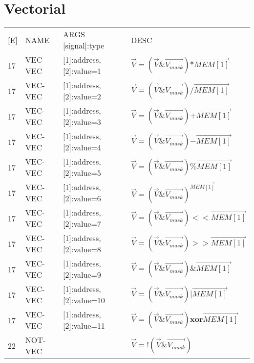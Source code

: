 \section{Vectorial}
\begin{tabular}{l | l | l  l}
[E] & NAME & ARGS [signal]:type & DESC \\
17 & VEC-VEC & [1]:address, [2]:value=1 & $\vec{V} = (\vec{V}\&\vec{V_{mask}}) \mathbf{*} \vec{MEM[1]}$\\  
17 & VEC-VEC & [1]:address, [2]:value=2 & $\vec{V} = (\vec{V}\&\vec{V_{mask}}) \mathbf{/} \vec{MEM[1]}$\\  
17 & VEC-VEC & [1]:address, [2]:value=3 & $\vec{V} = (\vec{V}\&\vec{V_{mask}}) \mathbf{+} \vec{MEM[1]}$\\  
17 & VEC-VEC & [1]:address, [2]:value=4 & $\vec{V} = (\vec{V}\&\vec{V_{mask}}) \mathbf{-} \vec{MEM[1]}$\\  
17 & VEC-VEC & [1]:address, [2]:value=5 & $\vec{V} = (\vec{V}\&\vec{V_{mask}}) \mathbf{\%} \vec{MEM[1]}$\\  
17 & VEC-VEC & [1]:address, [2]:value=6 & $\vec{V} = (\vec{V}\&\vec{V_{mask}})^{\vec{MEM[1]}}$\\  
17 & VEC-VEC & [1]:address, [2]:value=7 & $\vec{V} = (\vec{V}\&\vec{V_{mask}}) \mathbf{<<}\vec{MEM[1]}$\\  
17 & VEC-VEC & [1]:address, [2]:value=8 & $\vec{V} = (\vec{V}\&\vec{V_{mask}}) \mathbf{>>}\vec{MEM[1]}$\\  
17 & VEC-VEC & [1]:address, [2]:value=9 & $\vec{V} = (\vec{V}\&\vec{V_{mask}}) \mathbf{\&}\vec{MEM[1]}$\\  
17 & VEC-VEC & [1]:address, [2]:value=10 &$\vec{V} = (\vec{V}\&\vec{V_{mask}}) \mathbf{|}\vec{MEM[1]}$\\  
17 & VEC-VEC & [1]:address, [2]:value=11 & $\vec{V} = (\vec{V}\&\vec{V_{mask}})  \mathbf{xor}\vec{MEM[1]}$\\  
22 & NOT-VEC & & $\vec{V} = !(\vec{V}\&\vec{V_{mask}})$\\ 
\end{tabular}
